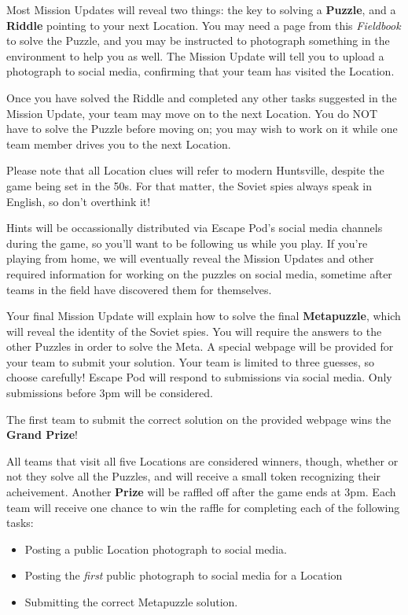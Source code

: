 \documentclass{puzzlehunt}
\begin{document}
Most Mission Updates will reveal two things: the key to solving a \textbf{Puzzle},
and a \textbf{Riddle} pointing to your next Location. You may need a page from
this \textit{Fieldbook} to solve the Puzzle, and you may be instructed
to photograph something in the environment to help you as well. The Mission Update
will tell you to upload a photograph to social media, confirming that your team
has visited the Location.

Once you have solved the Riddle and completed any other tasks suggested in
the Mission Update, your team may move on to the next Location. You do NOT have
to solve the Puzzle before moving on; you may wish to work on it while one team member
drives you to the next Location.

Please note that all Location clues will refer to
modern Huntsville, despite the game being set in the 50s. For that matter,
the Soviet spies always speak in English, so don't overthink it!

Hints will be occassionally distributed via Escape Pod's social media channels
during the game, so you'll want to be following us while you play. If you're playing
from home, we will eventually reveal the Mission Updates and other required information
for working on the puzzles on social media, sometime after teams in the field have
discovered them for themselves.


Your final Mission Update will explain how to solve the final
\textbf{Metapuzzle}, which will reveal the identity of the Soviet spies.
You will require the answers to the other Puzzles in order to solve the Meta.
A special webpage will be provided for your team to submit your solution. Your
team is limited to three guesses, so choose carefully! Escape Pod will respond
to submissions via social media. Only submissions before 3pm will be considered.


The first team to submit the correct solution on the provided webpage wins the
\textbf{Grand Prize}!

All teams that visit all five Locations are considered winners, though, whether
or not they solve all the Puzzles, and will receive a small token recognizing
their acheivement. Another \textbf{Prize} will be
raffled off after the game ends at 3pm. Each team will receive one chance to
win the raffle for completing each of the following tasks:

\begin{itemize}
  \item Posting a public Location photograph to social media.
  \item Posting the \textit{first} public photograph to social media for a Location
  \item Submitting the correct Metapuzzle solution.
\end{itemize}
\end{document}
